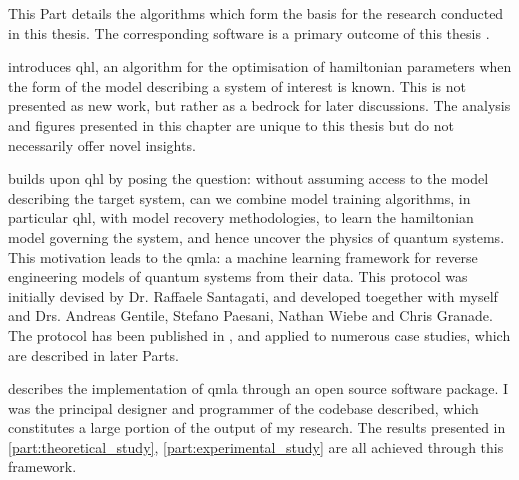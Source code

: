 
This Part details the algorithms which form the basis for the research conducted in this thesis. 
The corresponding software is a primary outcome of this thesis \cite{flynn2021Quantum, flynn2021QMLA, qmla_docs}.

\par 
\vspace{1cm}

 introduces \gls{qhl}, an algorithm for the optimisation of \gls{hamiltonian} parameters
    when the form of the model describing a system of interest is known. 
    This is not presented as new work, but rather as a bedrock for later discussions. 
    The analysis and figures presented in this chapter are unique to this thesis but do not necessarily offer novel insights. 
\par 
\vspace{1cm}
 builds upon \gls{qhl} by posing the question: 
    without assuming access to the model describing the target system, can we combine model training algorithms, 
    in particular \gls{qhl}, with model recovery methodologies, to learn the \gls{hamiltonian} model 
    governing the system, and hence uncover the physics of quantum systems. 
    This motivation leads to the \acrfull{qmla}: 
    a machine learning framework for reverse engineering models of quantum systems from their data.
    This protocol was initially devised by Dr. Raffaele Santagati, 
    and developed toegether with myself and Drs. Andreas Gentile, Stefano Paesani, Nathan Wiebe and Chris Granade. 
    The protocol has been published in \cite{gentile2020learning}, 
    and applied to numerous case studies, which are described in later Parts. 
\par
\vspace{1cm}

 describes the implementation of \gls{qmla} through an open source software package. 
I was the principal designer and programmer of the codebase described, which constitutes a large portion of the output of my research. 
The results presented in \cref{part:theoretical_study}, \cref{part:experimental_study} are all achieved through this framework. 
